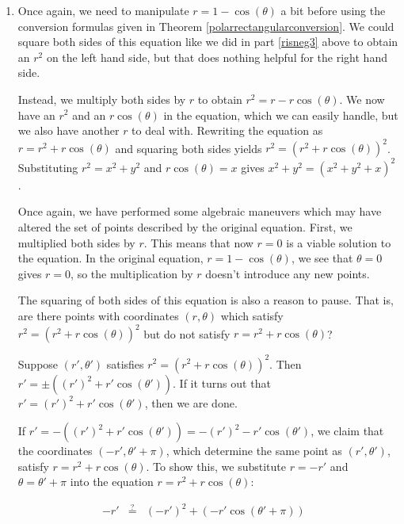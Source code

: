 \documentclass{ximera}
\begin{document}
\begin{example}
\begin{explanation}
\begin{enumerate}
\begin{enumerate}
\item  Once again, we need to manipulate   $r = 1 - \cos(\theta)$ a bit before using the conversion formulas given in Theorem \ref{polarrectangularconversion}.  We could square both sides of this equation like we did in part \ref{risneg3} above to obtain an $r^2$ on the left hand side, but that does nothing helpful for the right hand side.  

 

Instead, we multiply both sides by $r$ to obtain  $r^{2} = r - r\cos(\theta)$.  We now have an $r^2$ and an $r\cos(\theta)$ in the equation, which we can easily handle, but we also have another $r$ to deal with.  Rewriting the equation as $r = r^{2} + r\cos(\theta)$ and squaring both sides yields $r^2 = \left(r^2 + r\cos(\theta)\right)^2$.  Substituting $r^2 = x^2 + y^2$ and $r\cos(\theta) = x$ gives   $x^2 + y^2 = \left(x^2 + y^2 + x\right)^2$.  

 

Once again, we have performed some algebraic maneuvers which may have altered the set of points described by the original equation.  First, we multiplied both sides by $r$.  This means that now $r=0$ is a viable solution to the equation.  In the original equation, $r = 1 - \cos(\theta)$, we see that $\theta = 0$ gives $r=0$, so the multiplication by $r$ doesn't introduce any new points. 

 

The squaring of both sides of this equation is also a reason to pause.  That is, are there points with coordinates $(r,\theta)$ which satisfy $r^2 = \left(r^2 + r\cos(\theta)\right)^2$ but do not satisfy $r = r^2 + r\cos(\theta)$?  

 

Suppose $\left(r',\theta'\right)$ satisfies $r^2 = \left(r^2 + r\cos(\theta)\right)^2$.  Then $r' = \pm \left((r')^2 + r'\cos(\theta')\right)$.  If it turns out that $r' = (r')^2 + r'\cos(\theta')$, then we are done.  

 

If  $r' = -\left((r')^2 + r'\cos(\theta')\right) = -(r')^{2} - r'\cos(\theta')$, we claim that the coordinates $(-r', \theta' + \pi)$, which determine the same point as $(r',\theta')$, satisfy $r = r^2 + r\cos(\theta)$.  To show this, we substitute $r =  -r'$ and $\theta = \theta' + \pi$ into the equation $r = r^2 + r\cos(\theta)$:

\[ \begin{array}{rclr}

-r' & \stackrel{\text{?}}{=}  & \left(-r'\right)^2 + \left(-r' \cos(\theta' + \pi)\right) & \\


\end{array}\]
\end{enumerate}
\end{enumerate}
\end{explanation}
\end{example}
\end{document}
